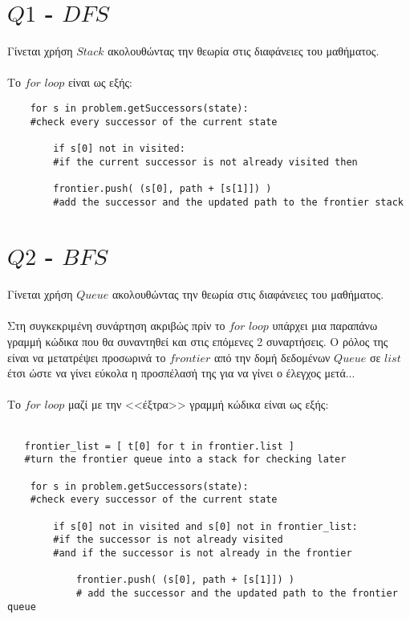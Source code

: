 \documentclass[12pt]{article}
\begin{document}
\section*{$Q1$ - $DFS$}
Γίνεται χρήση $Stack$ ακολουθώντας την θεωρία στις διαφάνειες του μαθήματος.\\\\
Το $for$ $loop$ είναι ως εξής:\\
\begin{otherlanguage}{english}
\begin{verbatim}
    for s in problem.getSuccessors(state):  
    #check every successor of the current state
        
        if s[0] not in visited:   
        #if the current successor is not already visited then
        
        frontier.push( (s[0], path + [s[1]]) )  
        #add the successor and the updated path to the frontier stack
\end{verbatim}
\end{otherlanguage}
\section*{$Q2$ - $BFS$}
Γίνεται χρήση $Queue$ ακολουθώντας την θεωρία στις διαφάνειες του μαθήματος.\\\\
Στη συγκεκριμένη συνάρτηση ακριβώς πρίν το $for$ $loop$ υπάρχει μια παραπάνω γραμμή κώδικα που θα συναντηθεί και στις επόμενες 2 συναρτήσεις. Ο ρόλος της είναι να μετατρέψει προσωρινά το $frontier$ από την δομή δεδομένων $Queue$ σε $list$ έτσι ώστε να γίνει εύκολα η προσπέλασή της για να γίνει ο έλεγχος μετά...\\\\
Το $for$ $loop$ μαζί με την <<έξτρα>> γραμμή κώδικα είναι ως εξής:\\\\
\begin{otherlanguage}{english}
\begin{verbatim}
   frontier_list = [ t[0] for t in frontier.list ]     
   #turn the frontier queue into a stack for checking later

    for s in problem.getSuccessors(state):              
    #check every successor of the current state
        
        if s[0] not in visited and s[0] not in frontier_list:   
        #if the successor is not already visited
        #and if the successor is not already in the frontier 
            
            frontier.push( (s[0], path + [s[1]]) )      
            # add the successor and the updated path to the frontier queue
\end{verbatim}
\end{otherlanguage}
\end{document}
